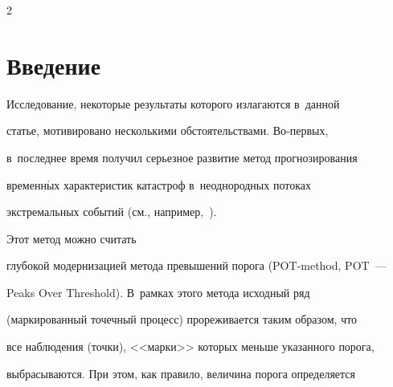 




\vspace*{-6pt}













\thispagestyle{headings}





\begin{multicols}{2}





\label{st\stat}











\section{Введение}





Исследование, некоторые результаты которого излагаются в~данной


статье, мотивировано несколькими обстоятельствами. Во-пер\-вых, 


в~последнее время получил серьезное развитие метод прогнозирования


временн$\acute{\mbox{ы}}$х характеристик катастроф в~неоднородных потоках


экстремальных событий (см., например,~\cite{GrigoryevaKorolevSokolov2013}).


 Этот метод можно считать


глубокой модернизацией метода превышений порога (POT-method, POT~---


Peaks Over Threshold). В~рамках этого метода исходный ряд


(маркированный точечный процесс) прореживается таким образом, что


все наблюдения (точки), <<марки>> которых меньше указанного порога,


выбрасываются. При этом, как правило, величина порога определяется



\end{multicols}

